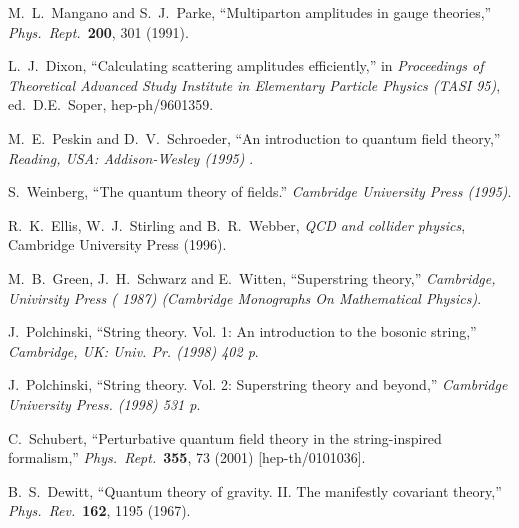 \documentclass[12pt]{livrev}
\begin{document}
\begin{thebibliography}{99}
M.~L.~Mangano and S.~J.~Parke,
``Multiparton amplitudes in gauge theories,''
{\it Phys.\ Rept.}\  {\bf 200}, 301 (1991).

L.~J.~Dixon,
``Calculating scattering amplitudes efficiently,''
in {\it Proceedings of Theoretical Advanced Study Institute
in Elementary Particle Physics (TASI 95)}, ed.\ D.E.\ Soper,
hep-ph/9601359.

M.~E.~Peskin and D.~V.~Schroeder,
``An introduction to quantum field theory,''
{\it  Reading, USA: Addison-Wesley (1995) }.

S.~Weinberg,
``The quantum theory of fields.''
{\it  Cambridge University Press (1995)}.

R.~K.~Ellis, W.~J.~Stirling and B.~R.~Webber, 
{\it QCD and collider physics}, Cambridge University Press (1996).

M.~B.~Green, J.~H.~Schwarz and E.~Witten,
``Superstring theory,''
{\it  Cambridge, Univirsity Press ( 1987)  
(Cambridge Monographs On Mathematical Physics)}.

J.~Polchinski,
``String theory. Vol. 1: An introduction to the bosonic string,''
{\it  Cambridge, UK: Univ. Pr. (1998) 402 p}.

J.~Polchinski,
``String theory. Vol. 2: Superstring theory and beyond,''
{\it  Cambridge University Press. (1998) 531 p}.

C.~Schubert,
``Perturbative quantum field theory in the string-inspired formalism,''
{\it Phys.\ Rept.}\  {\bf 355}, 73 (2001)
[hep-th/0101036].

B.~S.~Dewitt,
``Quantum theory of gravity. II. The manifestly covariant theory,''
{\it Phys.\ Rev.}\  {\bf 162}, 1195 (1967).


\end{thebibliography}
\end{document}
